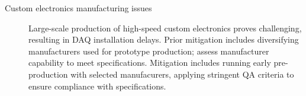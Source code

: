 \begin{description}
\item[Custom electronics manufacturing issues] Large-scale production of high-speed custom
  electronics proves challenging, resulting in DAQ installation delays. Prior mitigation includes diversifying manufacturers used for prototype production; assess manufacturer capability to meet specifications.  Mitigation includes running early pre-production with selected manufacurers, applying stringent QA criteria to ensure compliance with specifications.

\end{description}
